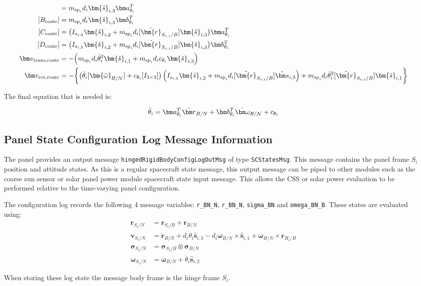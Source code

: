 \begin{align}
[A_{\textnormal{contr}}] &= m_{\text{sp}_i}d_i \bm{\hat{s}}_{i,3} \bm a_{\theta_i}^T
\\
[B_{\textnormal{contr}}] &= m_{\text{sp}_i}d_i \bm{\hat{s}}_{i,3} \bm b_{\theta_i}^T
\\
[C_{\textnormal{contr}}] &= \big( I_{s_{i,2}}\bm{\hat{s}}_{i,2}+m_{\text{sp}_i}d_i [\tilde{\bm{r}}_{S_{c,i}/B}] \bm{\hat{s}}_{i,3}\big)\bm a_{\theta_i}^T
\\
[D_{\textnormal{contr}}] &= \big( I_{s_{i,2}}\bm{\hat{s}}_{i,2}+m_{\text{sp}_i}d_i [\tilde{\bm{r}}_{S_{c,i}/B}] \bm{\hat{s}}_{i,3}\big) \bm b_{\theta_i}^T
\\
\bm v_{\text{trans,contr}} &= -\Big(m_{\text{sp}_i}d_i \dot{\theta}_i^2 \bm{\hat{s}}_{i,1}+m_{\text{sp}_i}d_i c_{\theta_i} \bm{\hat{s}}_{i,3} \Big)
\\
\bm v_{\text{rot,contr}} &= -\biggl\lbrace\big(\dot{\theta}_i [\bm{\tilde{\omega}}_{\cal B/N}] +c_{\theta_i} [I_{3\times3}]\big) \left(I_{s_{i,2}} \bm{\hat{s}}_{i,2}+m_{\text{sp}_i} d_i [\tilde{\bm{r}}_{S_{c,i}/B}] \hat{\bm s}_{i,3}\right) +m_{\text{sp}_i}d_i\dot{\theta}_i^2[\tilde{\bm{r}}_{S_{c,i}/B}] \bm{\hat{s}}_{i,1} \biggr\rbrace
\end{align}

The final equation that is needed is:

\begin{equation}
\ddot \theta_i = \bm a_{\theta_i}^T \ddot{\bm r}_{B/N} + \bm b_{\theta_i}^T \dot{\bm\omega}_{\cal B/N} + c_{\theta_i}
\label{eq:solar_panel_final5}
\end{equation}



\subsection{Panel State Configuration Log Message Information}
The panel provides an output message {\tt hingedRigidBodyConfigLogOutMsg} of type {\tt SCStatesMsg}.  This message contains the panel frame $S_i$ position and attitude states.  As this is a regular spacecraft state message, this output message can be piped to other modules such as the coarse sun sensor or solar panel power module spacecraft state input message.  This allows the CSS or solar power evaluation to be performed relative to the time-varying panel configuration.

The configuration log records the following 4 message variables: {\tt r\_BN\_N}, {\tt r\_BN\_N}, {\tt sigma\_BN} and {\tt omega\_BN\_B}.  These states are evaluated using:
\begin{align}
	\bm r_{S_i/N} &= \bm r_{S_i/B} + \bm r_{B/N}
	\\
	\bm v_{S_i/N} &= \dot{\bm r}_{B/N} + d_i \dot\theta_i \hat{\bm s}_{i,3} - d_i \bm\omega_{B/N}\times \hat{\bm s}_{i,1} + \bm\omega_{B/N} \times \bm r_{H_i/B}
	\\
	\bm\sigma_{S_i/N} &=  \bm\sigma_{S_i/B} \otimes\bm\sigma_{B/N}
	\\
	\bm\omega_{S_i/N} &= \bm\omega_{B/N} + \dot\theta_i \hat{\bm s}_{i,2}
\end{align}

When storing these log state the message body frame is the hinge frame $S_i$.
